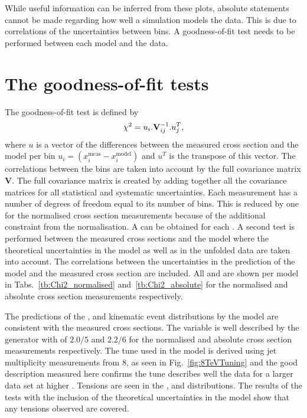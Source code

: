 While useful information can be inferred from these plots, absolute statements cannot be made regarding how well a simulation models the data.
This is due to correlations of the uncertainties between bins.
A \chisq{} goodness-of-fit test needs to be performed between each model and the data.


\section{The \chisq goodness-of-fit tests} %
\label{sec:the_goodness_of_fit_tests}

The \chisq{} goodness-of-fit test is defined by 
\begin{equation*}
	\chi^2 = u_{i} . \mathbf{V}^{-1}_{ij} . u^{T}_{j},
\end{equation*}
where $u$ is a vector of the differences between the measured cross section and the model per bin $u_{i}=(x_i^{\mathrm{meas}}-x_i^{\mathrm{model}})$ and $u^{T}$ is the transpose of this vector.
The correlations between the bins are taken into account by the full covariance matrix $\mathbf{V}$.
The full covariance matrix is created by adding together all the covariance matrices for all statistical and systematic uncertainties. 
Each measurement has a number of degrees of freedom equal to its number of bins.
This is reduced by one for the normalised cross section measurements because of the additional constraint from the normalisation.
A \pvalue{} can be obtained for each \chisndf{}.
A second \chisq{} test is performed between the measured cross sections and the \powhegpythia{} model where the theoretical uncertainties in the model as well as in the unfolded data are taken into account.
The correlations between the uncertainties in the prediction of the model and the measured cross section are included.
All \chisndf{} and \pvalues{} are shown per \ttbar{} model in Tabs.~\ref{tb:Chi2_normalised} and~\ref{tb:Chi2_absolute} for the normalised and absolute cross section measurements respectively.

The predictions of the \ST{}, \ptmiss{} and \LPT{} kinematic event distributions by the \powhegpythia{} model are consistent with the measured cross sections.
The \NJET{} variable is well described by the \powhegpythia{} generator with \chisndf{} of $2.0/5$ and $2.2/6$ for the normalised and absolute cross section measurements respectively.
The tune \cuettune{} used in the \powhegpythia{} model is derived using jet multiplicity measurements from 8\TeV{}, as seen in Fig.~\ref{fig:8TeVTuning} and the good description measured here confirms the tune describes well the data for a larger data set at higher \sqrts{}.
Tensions are seen in the \ST{}, \WPT{} and \LETA{} distributions.
The results of the \chisq{} tests with the inclusion of the theoretical uncertainties in the \powhegpythia{} model show that any tensions observed are covered.

